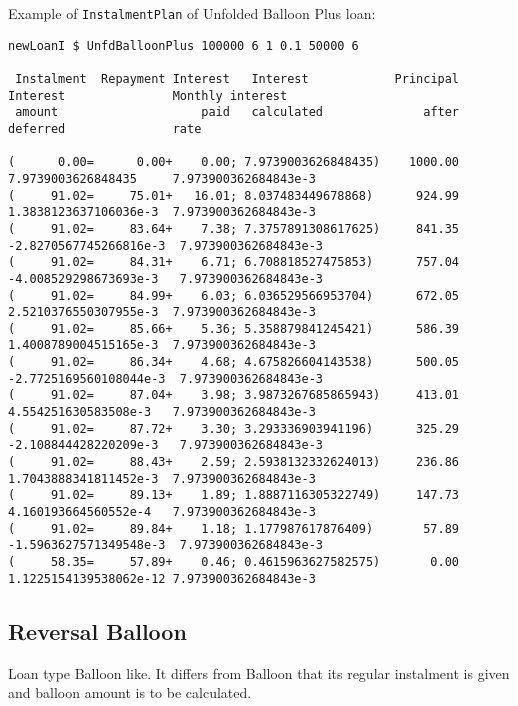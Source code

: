 \documentclass[letterpaper,11pt]{article}
\begin{document}
Example of {\tt InstalmentPlan} of Unfolded Balloon Plus loan:
{\footnotesize
\begin{samepage}
\begin{verbatim}
newLoanI $ UnfdBalloonPlus 100000 6 1 0.1 50000 6

 Instalment  Repayment Interest   Interest            Principal  Interest               Monthly interest
 amount                    paid   calculated              after  deferred               rate

(      0.00=      0.00+    0.00; 7.9739003626848435)    1000.00  7.9739003626848435     7.973900362684843e-3
(     91.02=     75.01+   16.01; 8.037483449678868)      924.99  1.3838123637106036e-3  7.973900362684843e-3
(     91.02=     83.64+    7.38; 7.3757891308617625)     841.35 -2.8270567745266816e-3  7.973900362684843e-3
(     91.02=     84.31+    6.71; 6.708818527475853)      757.04 -4.008529298673693e-3   7.973900362684843e-3
(     91.02=     84.99+    6.03; 6.036529566953704)      672.05  2.5210376550307955e-3  7.973900362684843e-3
(     91.02=     85.66+    5.36; 5.358879841245421)      586.39  1.4008789004515165e-3  7.973900362684843e-3
(     91.02=     86.34+    4.68; 4.675826604143538)      500.05 -2.7725169560108044e-3  7.973900362684843e-3
(     91.02=     87.04+    3.98; 3.9873267685865943)     413.01  4.554251630583508e-3   7.973900362684843e-3
(     91.02=     87.72+    3.30; 3.293336903941196)      325.29 -2.108844428220209e-3   7.973900362684843e-3
(     91.02=     88.43+    2.59; 2.5938132332624013)     236.86  1.7043888341811452e-3  7.973900362684843e-3
(     91.02=     89.13+    1.89; 1.8887116305322749)     147.73  4.160193664560552e-4   7.973900362684843e-3
(     91.02=     89.84+    1.18; 1.177987617876409)       57.89 -1.5963627571349548e-3  7.973900362684843e-3
(     58.35=     57.89+    0.46; 0.4615963627582575)       0.00  1.1225154139538062e-12 7.973900362684843e-3
\end{verbatim}
\end{samepage}
}

\subsection{Reversal Balloon}
Loan type Balloon like. It differs from Balloon that its regular instalment
is given and balloon amount is to be calculated.
\end{document}
